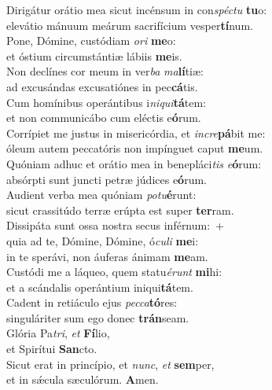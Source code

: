 \evenverse Dirigátur orátio mea sicut incénsum in con\textit{spé}\textit{ctu} \textbf{tu}o:~\*\\
\evenverse elevátio mánuum meárum sacrifícium vesper\textbf{tí}num.\\
\oddverse Pone, Dómine, custódiam \textit{o}\textit{ri} \textbf{me}o:~\*\\
\oddverse et óstium circumstántiæ lábiis \textbf{me}is.\\
\evenverse Non declínes cor meum in ver\textit{ba} \textit{ma}\textbf{lí}tiæ:~\*\\
\evenverse ad excusándas excusatiónes in pec\textbf{cá}tis.\\
\oddverse Cum homínibus operántibus i\textit{ni}\textit{qui}\textbf{tá}tem:~\*\\
\oddverse et non communicábo cum eléctis e\textbf{ó}rum.\\
\evenverse Corrípiet me justus in misericórdia, et \textit{in}\textit{cre}\textbf{pá}bit me:~\*\\
\evenverse óleum autem peccatóris non impínguet caput \textbf{me}um.\\
\oddverse Quóniam adhuc et orátio mea in benepláci\textit{tis} \textit{e}\textbf{ó}rum:~\*\\
\oddverse absórpti sunt juncti petræ júdices e\textbf{ó}rum.\\
\evenverse Audient verba mea quóniam \textit{po}\textit{tu}\textbf{é}runt:~\*\\
\evenverse sicut crassitúdo terræ erúpta est super \textbf{ter}ram.\\
\oddverse Dissipáta sunt ossa nostra secus inférnum:~+\\
\oddverse  quia ad te, Dómine, Dómine, ó\textit{cu}\textit{li} \textbf{me}i:~\*\\
\oddverse in te sperávi, non áuferas ánimam \textbf{me}am.\\
\evenverse Custódi me a láqueo, quem statu\textit{é}\textit{runt} \textbf{mi}hi:~\*\\
\evenverse et a scándalis operántium iniqui\textbf{tá}tem.\\
\oddverse Cadent in retiáculo ejus \textit{pec}\textit{ca}\textbf{tó}res:~\*\\
\oddverse singuláriter sum ego donec \textbf{trán}seam.\\
\evenverse Glória Pa\textit{tri}, \textit{et} \textbf{Fí}lio,~\*\\
\evenverse et Spirítui \textbf{San}cto.\\
\oddverse Sicut erat in princípio, et \textit{nunc}, \textit{et} \textbf{sem}per,~\*\\
\oddverse et in sǽcula sæculórum. \textbf{A}men.\\
